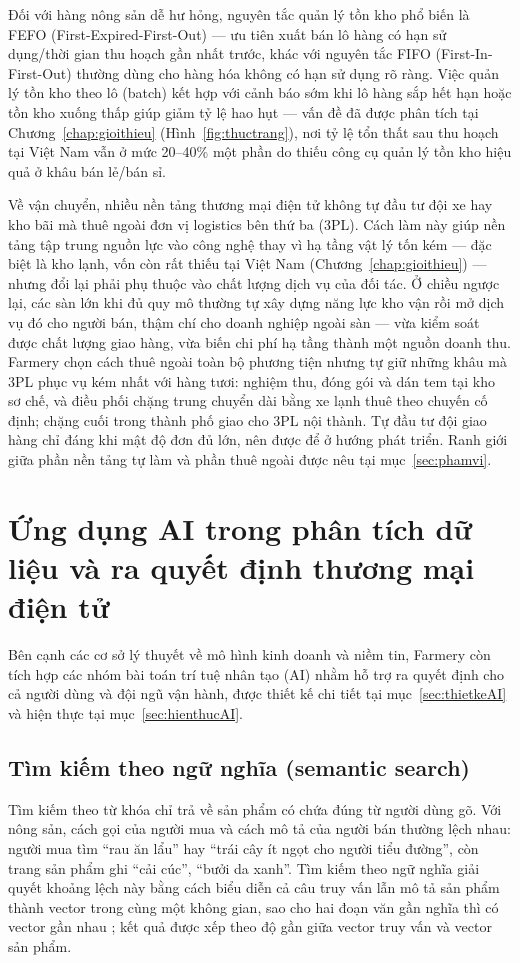 Đối với hàng nông sản dễ hư hỏng, nguyên tắc quản lý tồn kho phổ biến là FEFO (First-Expired-First-Out) --- ưu tiên xuất bán lô hàng có hạn sử dụng/thời gian thu hoạch gần nhất trước, khác với nguyên tắc FIFO (First-In-First-Out) thường dùng cho hàng hóa không có hạn sử dụng rõ ràng. Việc quản lý tồn kho theo lô (batch) kết hợp với cảnh báo sớm khi lô hàng sắp hết hạn hoặc tồn kho xuống thấp giúp giảm tỷ lệ hao hụt --- vấn đề đã được phân tích tại Chương~\ref{chap:gioithieu} (Hình~\ref{fig:thuctrang}), nơi tỷ lệ tổn thất sau thu hoạch tại Việt Nam vẫn ở mức 20--40\% một phần do thiếu công cụ quản lý tồn kho hiệu quả ở khâu bán lẻ/bán sỉ.

Về vận chuyển, nhiều nền tảng thương mại điện tử không tự đầu tư đội xe hay kho bãi mà thuê ngoài đơn vị logistics bên thứ ba (3PL). Cách làm này giúp nền tảng tập trung nguồn lực vào công nghệ thay vì hạ tầng vật lý tốn kém --- đặc biệt là kho lạnh, vốn còn rất thiếu tại Việt Nam (Chương~\ref{chap:gioithieu}) --- nhưng đổi lại phải phụ thuộc vào chất lượng dịch vụ của đối tác. Ở chiều ngược lại, các sàn lớn khi đủ quy mô thường tự xây dựng năng lực kho vận rồi mở dịch vụ đó cho người bán, thậm chí cho doanh nghiệp ngoài sàn --- vừa kiểm soát được chất lượng giao hàng, vừa biến chi phí hạ tầng thành một nguồn doanh thu. Farmery chọn cách thuê ngoài toàn bộ phương tiện nhưng tự giữ những khâu mà 3PL phục vụ kém nhất với hàng tươi: nghiệm thu, đóng gói và dán tem tại kho sơ chế, và điều phối chặng trung chuyển dài bằng xe lạnh thuê theo chuyến cố định; chặng cuối trong thành phố giao cho 3PL nội thành. Tự đầu tư đội giao hàng chỉ đáng khi mật độ đơn đủ lớn, nên được để ở hướng phát triển. Ranh giới giữa phần nền tảng tự làm và phần thuê ngoài được nêu tại mục~\ref{sec:phamvi}.

\section{Ứng dụng AI trong phân tích dữ liệu và ra quyết định thương mại điện tử}

Bên cạnh các cơ sở lý thuyết về mô hình kinh doanh và niềm tin, Farmery còn tích hợp các nhóm bài toán trí tuệ nhân tạo (AI) nhằm hỗ trợ ra quyết định cho cả người dùng và đội ngũ vận hành, được thiết kế chi tiết tại mục~\ref{sec:thietkeAI} và hiện thực tại mục~\ref{sec:hienthucAI}.

\subsection{Tìm kiếm theo ngữ nghĩa (semantic search)}
\label{subsec:semanticsearch}
Tìm kiếm theo từ khóa chỉ trả về sản phẩm có chứa đúng từ người dùng gõ. Với nông sản, cách gọi của người mua và cách mô tả của người bán thường lệch nhau: người mua tìm ``rau ăn lẩu'' hay ``trái cây ít ngọt cho người tiểu đường'', còn trang sản phẩm ghi ``cải cúc'', ``bưởi da xanh''. Tìm kiếm theo ngữ nghĩa giải quyết khoảng lệch này bằng cách biểu diễn cả câu truy vấn lẫn mô tả sản phẩm thành vector trong cùng một không gian, sao cho hai đoạn văn gần nghĩa thì có vector gần nhau \parencite{reimers2019sbert}; kết quả được xếp theo độ gần giữa vector truy vấn và vector sản phẩm.

